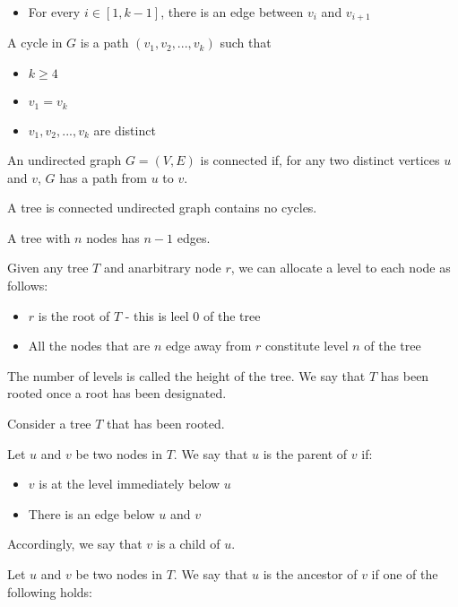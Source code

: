 \documentclass[10pt,a4paper]{article}
\begin{document}
\begin{multicols}{3}
    \begin{itemize}
        \item For every $i \in [1, k-1]$, there is an edge between $v_i$ and $v_{i+1}$
    \end{itemize}

    A cycle in $G$ is a path $(v_1, v_2, ..., v_k)$ such that

    \begin{itemize}
        \item $k \geqslant 4$
        \item $v_1 = v_k$
        \item $v_1, v_2, ..., v_k$ are distinct
    \end{itemize}


    An undirected graph $G = (V, E)$ is connected if, for any two distinct vertices $u$ and $v$, $G$ has a path from $u$ to $v$.

    A tree is connected undirected graph contains no cycles.

    A tree with $n$ nodes has $n - 1$ edges.

    Given any tree $T$ and anarbitrary node $r$, we can allocate a level to each node as follows:

    \begin{itemize}
        \item $r$ is the root of $T$ - this is leel 0 of the tree
        \item All the nodes that are $n$ edge away from $r$ constitute level $n$ of the tree
    \end{itemize}

    The number of levels is called the height of the tree. We say that $T$ has been rooted once a root has been designated.

    Consider a tree $T$ that has been rooted.

    Let $u$ and $v$ be two nodes in $T$. We say that $u$ is the parent of $v$ if:

    \begin{itemize}
        \item $v$ is at the level immediately below $u$
        \item There is an edge below $u$ and $v$
    \end{itemize}

    Accordingly, we say that $v$ is a child of $u$.


    Let $u$ and $v$ be two nodes in $T$. We say that $u$ is the ancestor of $v$ if one of the following holds:


\end{multicols}
\end{document}
